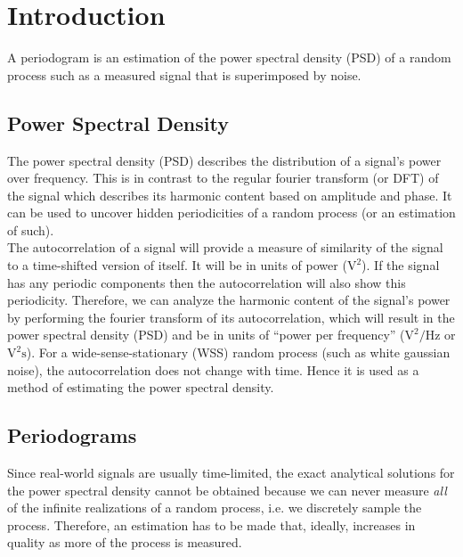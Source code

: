 \section{Introduction}
A periodogram is an estimation of the power spectral density (PSD) of a random process such as a measured signal that is superimposed by noise.

\subsection{Power Spectral Density}
The power spectral density (PSD) describes the distribution of a signal's power over frequency. This is in contrast to the regular fourier transform (or DFT) of the signal which describes its harmonic content based on amplitude and phase. It can be used to uncover hidden periodicities of a random process (or an estimation of such).\cite{weather_radar}
\\

The autocorrelation of a signal will provide a measure of similarity of the signal to a time-shifted version of itself. It will be in units of power ($\si{\volt\squared}$). If the signal has any periodic components then the autocorrelation will also show this periodicity. Therefore, we can analyze the harmonic content of the signal's power by performing the fourier transform of its autocorrelation, which will result in the power spectral density (PSD) and be in units of ``power per frequency'' ($\si{\volt\squared\per\hertz}$ or $\si{\volt\squared\second}$).
For a wide-sense-stationary (WSS) random process (such as white gaussian noise), the autocorrelation does not change with time. Hence it is used as a method of estimating the power spectral density. \cite{weather_radar}\cite{book_2}

\subsection{Periodograms}
Since real-world signals are usually time-limited, the exact analytical solutions for the power spectral density cannot be obtained because we can never measure \textit{all} of the infinite realizations of a random process, i.e. we discretely sample the process. Therefore, an estimation has to be made that, ideally, increases in quality as more of the process is measured. \cite{book_2}\cite{weather_radar}  %

